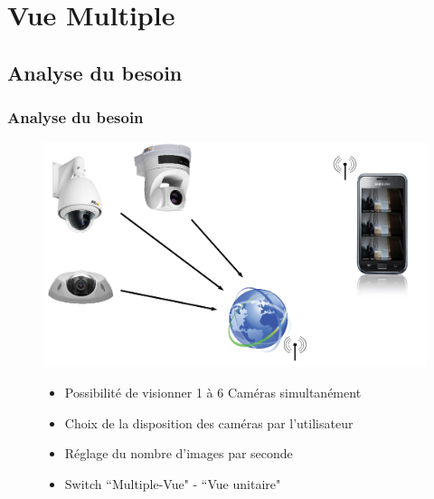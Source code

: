 
\section{Vue Multiple}
  \subsection{Analyse du besoin}
  \begin{frame}
   \frametitle{Analyse du besoin}


\begin{figure}[H]
  \centering
  \includegraphics[scale=0.25]{Images/ImageSlide9.png}
     \begin{itemize}
    \item Possibilité de visionner 1 à 6 Caméras simultanément
    \item Choix de la disposition des caméras par l'utilisateur
    \item Réglage du nombre d'images par seconde
    \item Switch ``Multiple-Vue" - ``Vue unitaire"
   \end{itemize}
  \end{figure}  

\end{frame}
